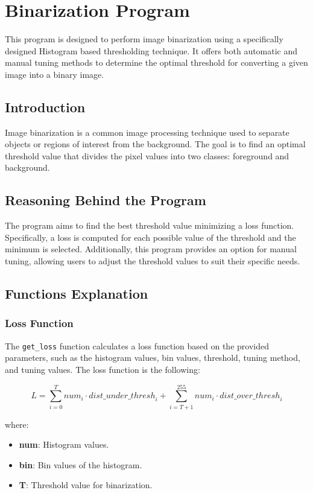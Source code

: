\section{Binarization Program}

This program is designed to perform image binarization using a specifically designed Histogram based thresholding technique.
It offers both automatic and manual tuning methods to determine the optimal threshold for converting a given image into a binary image.

\subsection{Introduction}

Image binarization is a common image processing technique used to separate objects or regions of interest from the background.
The goal is to find an optimal threshold value that divides the pixel values into two classes: foreground and background.

\subsection{Reasoning Behind the Program}

The program aims to find the best threshold value minimizing a loss function. Specifically, a loss is computed for each possible value of the threshold and the minimum is selected. Additionally, this program provides an option for manual tuning, allowing users to adjust the threshold values to suit their specific needs.

\subsection{Functions Explanation}

\subsubsection*{Loss Function}

The \texttt{get\_loss} function calculates a loss function based on the provided parameters, such as the histogram values, bin values, threshold, tuning method, and tuning values. The loss function is the following:

$$
    L = \sum_{i=0}^{T} {{num}}_{i} \cdot {{dist\_under\_thresh}}_{i} + \sum_{i=T+1}^{255} {{num}}_{i} \cdot {{dist\_over\_thresh}}_{i}
$$

where:
\begin{itemize}
    \item \textbf{num}: Histogram values.
    \item \textbf{bin}: Bin values of the histogram.
    \item \textbf{T}: Threshold value for binarization.
\end{itemize}

